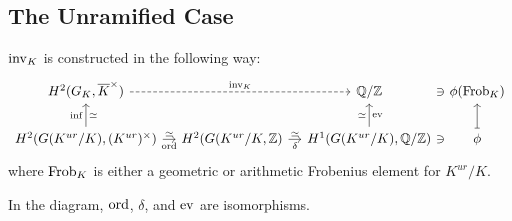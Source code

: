 \documentclass[class=article, crop=false]{standalone}
\begin{document}
\subsection{The Unramified Case}
$\operatorname{inv}_K$ is constructed in the following way:
\[
	\begin{tikzcd}[column sep=1em]
		H^{2}(G_K,\overline{K}^{\times})\ar[rr,dashed,"\inv_K"] & & \QQ/\ZZ &[-1.5em] \ni &[-1.5em] \phi(\Frob_K)\\
		H^{2}(G(K^{ur}/K),(K^{ur})^{\times})\ar[r,"\ord"',"\simeq"]\ar[u,"\inf","\simeq"'] & H^{2}(G(K^{ur}/K,\ZZ)\ar[r,"\delta"',"\simeq"] & H^{1}(G(K^{ur}/K),\QQ/\ZZ)\ar[u,"\ev"',"\simeq"] &[-1.5em] \ni &[-1.5em] \phi\ar[u,mapsto] 
\end{tikzcd}
\] 
where $\operatorname{Frob}_K$ is either a geometric or arithmetic Frobenius element for $K^{ur}/K$.
\begin{proposition}
	In the diagram, $\operatorname{ord}$, $\delta$, and $\operatorname{ev}$ are isomorphisms.
\end{proposition}
\end{document}
